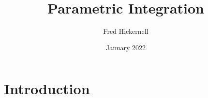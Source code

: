 \documentclass{article}
\title{Parametric Integration}
\author{Fred Hickernell}
\date{January 2022}
\begin{document}
\maketitle

\section{Introduction}
\end{document}

